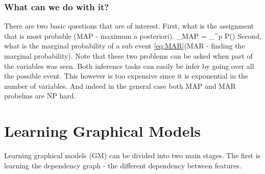 \subsubsection{What can we do with it?}
There are two basic questions that are of interest.
First, what is the assignment that is most probable (MAP - maximum a posteriori).
\be
\label{eq:MAP}
\xx_{MAP} = \arg \max_{\xx \in \cX^p} P(\xx) 
\ee
Second, what is the marginal probability of a sub event \eqref{eq:MAR}(MAR - finding the marginal probability).
Note that these two problems can be asked when part of the variables was seen.
Both inference tasks can easily be infer by going over all the possible event.
This however is too expensive since it is exponential in the number of variables.
And indeed in the general case both MAP\cite{shimony1994finding} and MAR\cite{cooper1990computational} probelms are NP hard.

  






\section{Learning Graphical Models}
Learning graphical models (GM) can be divided into two main stages.
The first is learning the dependency graph - the different dependency between features.
